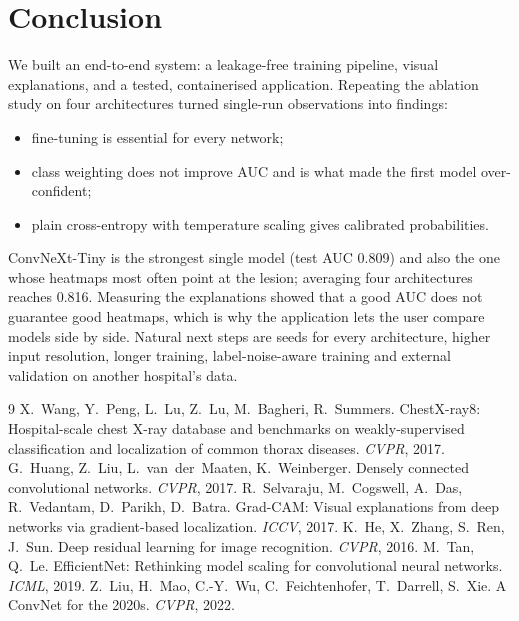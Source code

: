 \documentclass[11pt,a4paper]{article}
\begin{document}
\section{Conclusion}
We built an end-to-end system: a leakage-free training pipeline, visual explanations, and a tested, containerised application. Repeating the ablation study on four architectures turned single-run observations into findings:
\begin{itemize}
  \item fine-tuning is essential for every network;
  \item class weighting does not improve AUC and is what made the first model over-confident;
  \item plain cross-entropy with temperature scaling gives calibrated probabilities.
\end{itemize}
ConvNeXt-Tiny is the strongest single model (test AUC 0.809) and also the one whose heatmaps most often point at the lesion; averaging four architectures reaches 0.816. Measuring the explanations showed that a good AUC does not guarantee good heatmaps, which is why the application lets the user compare models side by side. Natural next steps are seeds for every architecture, higher input resolution, longer training, label-noise-aware training and external validation on another hospital's data.

\begin{thebibliography}{9}
 X.~Wang, Y.~Peng, L.~Lu, Z.~Lu, M.~Bagheri, R.~Summers. ChestX-ray8: Hospital-scale chest X-ray database and benchmarks on weakly-supervised classification and localization of common thorax diseases. \emph{CVPR}, 2017.
 G.~Huang, Z.~Liu, L.~van~der~Maaten, K.~Weinberger. Densely connected convolutional networks. \emph{CVPR}, 2017.
 R.~Selvaraju, M.~Cogswell, A.~Das, R.~Vedantam, D.~Parikh, D.~Batra. Grad-CAM: Visual explanations from deep networks via gradient-based localization. \emph{ICCV}, 2017.
 K.~He, X.~Zhang, S.~Ren, J.~Sun. Deep residual learning for image recognition. \emph{CVPR}, 2016.
 M.~Tan, Q.~Le. EfficientNet: Rethinking model scaling for convolutional neural networks. \emph{ICML}, 2019.
 Z.~Liu, H.~Mao, C.-Y.~Wu, C.~Feichtenhofer, T.~Darrell, S.~Xie. A ConvNet for the 2020s. \emph{CVPR}, 2022.
\end{thebibliography}
\end{document}
